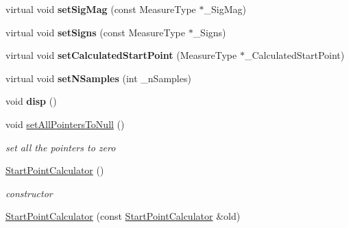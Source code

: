 \begin{DoxyCompactItemize}
\item 
\hypertarget{class_ox_1_1_start_point_calculator_a7cff5323e92bc00fdc9baa2a3eef7a37}{virtual void {\bfseries set\-Sig\-Mag} (const Measure\-Type $\ast$\-\_\-\-Sig\-Mag)}\label{class_ox_1_1_start_point_calculator_a7cff5323e92bc00fdc9baa2a3eef7a37}

\item 
\hypertarget{class_ox_1_1_start_point_calculator_a1245375d6cad369f18ab4a32ddb28446}{virtual void {\bfseries set\-Signs} (const Measure\-Type $\ast$\-\_\-\-Signs)}\label{class_ox_1_1_start_point_calculator_a1245375d6cad369f18ab4a32ddb28446}

\item 
\hypertarget{class_ox_1_1_start_point_calculator_aebb0511e802eff920369dec99b6c00fb}{virtual void {\bfseries set\-Calculated\-Start\-Point} (Measure\-Type $\ast$\-\_\-\-Calculated\-Start\-Point)}\label{class_ox_1_1_start_point_calculator_aebb0511e802eff920369dec99b6c00fb}

\item 
\hypertarget{class_ox_1_1_start_point_calculator_a72195ac7840734cd9001d0303ab859f4}{virtual void {\bfseries set\-N\-Samples} (int \-\_\-n\-Samples)}\label{class_ox_1_1_start_point_calculator_a72195ac7840734cd9001d0303ab859f4}

\item 
\hypertarget{class_ox_1_1_start_point_calculator_a1e68d3a23cee006d4dbdd47583c5d316}{void {\bfseries disp} ()}\label{class_ox_1_1_start_point_calculator_a1e68d3a23cee006d4dbdd47583c5d316}

\item 
\hypertarget{class_ox_1_1_start_point_calculator_a00a48e8845623b57e414380924a3f82b}{void \hyperlink{class_ox_1_1_start_point_calculator_a00a48e8845623b57e414380924a3f82b}{set\-All\-Pointers\-To\-Null} ()}\label{class_ox_1_1_start_point_calculator_a00a48e8845623b57e414380924a3f82b}

\begin{DoxyCompactList}\small\item\em set all the pointers to zero \end{DoxyCompactList}\item 
\hypertarget{class_ox_1_1_start_point_calculator_a408ce85b6fbf0ee69f4eca3176b814d6}{\hyperlink{class_ox_1_1_start_point_calculator_a408ce85b6fbf0ee69f4eca3176b814d6}{Start\-Point\-Calculator} ()}\label{class_ox_1_1_start_point_calculator_a408ce85b6fbf0ee69f4eca3176b814d6}

\begin{DoxyCompactList}\small\item\em constructor \end{DoxyCompactList}\item 
\hypertarget{class_ox_1_1_start_point_calculator_ab6b12ed8fa6b47b3335b5c7a92b94623}{\hyperlink{class_ox_1_1_start_point_calculator_ab6b12ed8fa6b47b3335b5c7a92b94623}{Start\-Point\-Calculator} (const \hyperlink{class_ox_1_1_start_point_calculator}{Start\-Point\-Calculator} \&old)}\label{class_ox_1_1_start_point_calculator_ab6b12ed8fa6b47b3335b5c7a92b94623}


\end{DoxyCompactItemize}
